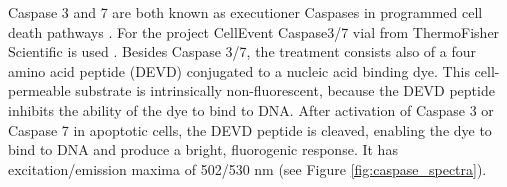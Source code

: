 \documentclass[pdftex,12pt,a4paper]{report}
\begin{document}
Caspase 3 and 7 are both known as executioner Caspases in programmed cell death pathways \cite{alberts2017molecular}. For the project CellEvent Caspase3/7 vial from ThermoFisher Scientific is used  \cite{thermofisher2018casp}. Besides Caspase 3/7, the treatment consists also of a four amino acid peptide (DEVD) conjugated to a nucleic acid binding dye. This cell-permeable substrate is intrinsically non-fluorescent, because the DEVD peptide inhibits the ability of the dye to bind to DNA. After activation of Caspase 3 or Caspase 7 in apoptotic cells, the DEVD peptide is cleaved, enabling the dye to bind to DNA and produce a bright, fluorogenic response.  It has excitation/emission maxima of 502/530 nm (see Figure \ref{fig:caspase_spectra}).

\begin{figure}[H]

\centering


\end{figure}
\end{document}
